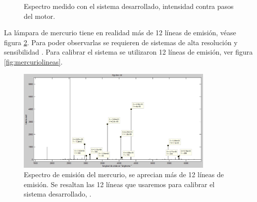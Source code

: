 \begin{figure}[h]
	\centering
	
	\caption{Espectro medido con el sistema desarrollado, intensidad contra pasos del motor.}
	\label{fig:hg-04-m99-50pps}
\end{figure}  

La lámpara de mercurio tiene en realidad más de 12 líneas de emisión, véase figura \ref{fig:emisionhglibro}. Para poder observarlas se requieren de sistemas de alta resolución y sensibilidad \cite{CRC2016}. Para calibrar el sistema se utilizaron 12 líneas de emisión, ver figura \ref{fig:mercuriolineas}.
\begin{figure}
	\centering
	\includegraphics[width=0.9\linewidth,height=5cm]{Imagenes/3/emisionHgLibro}
	\caption{Espectro de emisión del mercurio, se aprecian más de 12 líneas de emisión. Se resaltan las 12 líneas que usaremos para calibrar el sistema desarrollado, \cite{CRC2016}.}
	\label{fig:emisionhglibro}
\end{figure}


